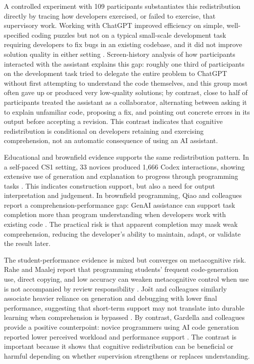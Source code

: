 A controlled experiment with 109 participants substantiates this redistribution directly by tracing how developers exercised, or failed to exercise, that supervisory work. Working with ChatGPT improved efficiency on simple, well-specified coding puzzles but not on a typical small-scale development task requiring developers to fix bugs in an existing codebase, and it did not improve solution quality in either setting \cite{wang_rocks_2024}. Screen-history analysis of how participants interacted with the assistant explains this gap: roughly one third of participants on the development task tried to delegate the entire problem to ChatGPT without first attempting to understand the code themselves, and this group most often gave up or produced very low-quality solutions; by contrast, close to half of participants treated the assistant as a collaborator, alternating between asking it to explain unfamiliar code, proposing a fix, and pointing out concrete errors in its output before accepting a revision. This contrast indicates that cognitive redistribution is conditional on developers retaining and exercising comprehension, not an automatic consequence of using an AI assistant.

Educational and brownfield evidence supports the same redistribution pattern. In a self-paced CS1 setting, 33 novices produced 1,666 Codex interactions, showing extensive use of generation and explanation to progress through programming tasks \cite{kazemitabaar_how_2023}. This indicates construction support, but also a need for output interpretation and judgement. In brownfield programming, Qiao and colleagues report a comprehension-performance gap: GenAI assistance can support task completion more than program understanding when developers work with existing code \cite{qiao_comprehension-performance_2025}. The practical risk is that apparent completion may mask weak comprehension, reducing the developer's ability to maintain, adapt, or validate the result later.

The student-performance evidence is mixed but converges on metacognitive risk. Rahe and Maalej report that programming students' frequent code-generation use, direct copying, and low accuracy can weaken metacognitive control when use is not accompanied by review responsibility \cite{rahe_how_2025}. Jo\v{s}t and colleagues similarly associate heavier reliance on generation and debugging with lower final performance, suggesting that short-term support may not translate into durable learning when comprehension is bypassed \cite{jost_impact_2024}. By contrast, Gardella and colleagues provide a positive counterpoint: novice programmers using AI code generation reported lower perceived workload and performance support \cite{gardella_performance_2024}. The contrast is important because it shows that cognitive redistribution can be beneficial or harmful depending on whether supervision strengthens or replaces understanding.

